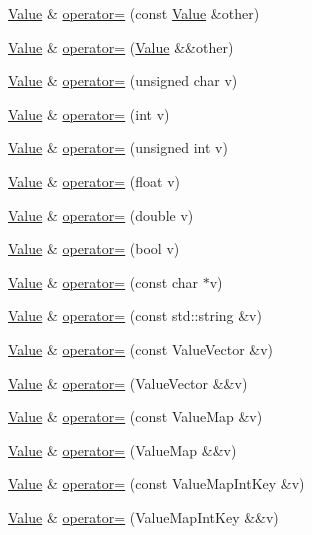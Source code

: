 \begin{DoxyCompactItemize}
\item 
\hyperlink{classValue}{Value} \& \hyperlink{classValue_a3d7fc55aff39856902e74bf8577296cb}{operator=} (const \hyperlink{classValue}{Value} \&other)
\item 
\hyperlink{classValue}{Value} \& \hyperlink{classValue_ac97efea0f73007b2891dfbe90522eb54}{operator=} (\hyperlink{classValue}{Value} \&\&other)
\item 
\hyperlink{classValue}{Value} \& \hyperlink{classValue_a6ebdc1caa0edbda13f4bf430bb011294}{operator=} (unsigned char v)
\item 
\hyperlink{classValue}{Value} \& \hyperlink{classValue_a159c0ef7a1c285a39b5719d0eed34109}{operator=} (int v)
\item 
\hyperlink{classValue}{Value} \& \hyperlink{classValue_ac1948d494a3331392c329177680d648d}{operator=} (unsigned int v)
\item 
\hyperlink{classValue}{Value} \& \hyperlink{classValue_a6213233683312cb0279d341bc8d1b926}{operator=} (float v)
\item 
\hyperlink{classValue}{Value} \& \hyperlink{classValue_a26c98fc44012d2b87ab03c4c6054358c}{operator=} (double v)
\item 
\hyperlink{classValue}{Value} \& \hyperlink{classValue_aa2290ea3c3f4513308dd4f132d3bbd5a}{operator=} (bool v)
\item 
\hyperlink{classValue}{Value} \& \hyperlink{classValue_a44828817011378e6ac08b983f6aa6b7e}{operator=} (const char $\ast$v)
\item 
\hyperlink{classValue}{Value} \& \hyperlink{classValue_a09862f2666ab6ed3ab70f16f30fb71c4}{operator=} (const std\+::string \&v)
\item 
\hyperlink{classValue}{Value} \& \hyperlink{classValue_af58ae0694c68b492d08485c9b25d6107}{operator=} (const Value\+Vector \&v)
\item 
\hyperlink{classValue}{Value} \& \hyperlink{classValue_a8e0561e9459189d65205e4bc7fbb99fd}{operator=} (Value\+Vector \&\&v)
\item 
\hyperlink{classValue}{Value} \& \hyperlink{classValue_af315e9abe3fb288a5558f9df1059f5c1}{operator=} (const Value\+Map \&v)
\item 
\hyperlink{classValue}{Value} \& \hyperlink{classValue_a2902ae76847e39fa3eee51d185e8134a}{operator=} (Value\+Map \&\&v)
\item 
\hyperlink{classValue}{Value} \& \hyperlink{classValue_a9f4eb06f7349b670af49e23fb3dced5f}{operator=} (const Value\+Map\+Int\+Key \&v)
\item 
\hyperlink{classValue}{Value} \& \hyperlink{classValue_a27de6bd2138051675b083f29f6275504}{operator=} (Value\+Map\+Int\+Key \&\&v)

\end{DoxyCompactItemize}
